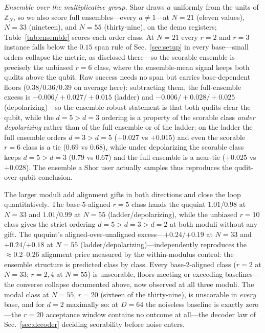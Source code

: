 \documentclass[aps,pra,reprint,superscriptaddress,nofootinbib,floatfix]{revtex4-2}
\begin{document}
\emph{Ensemble over the multiplicative group.} Shor draws $a$
uniformly from the units of $\mathbb{Z}_N$, so we also score full
ensembles---every $a\neq1$---at $N=21$ (eleven values), $N=33$
(nineteen), and $N=55$ (thirty-nine), on the demo registers;
Table~\ref{tab:ensemble} scores each order class. At $N=21$ every
$r=2$ and $r=3$ instance falls below the $0.15$ span rule of
Sec.~\ref{sec:setup} in every base---small orders collapse the
metric, as disclosed there---so the scorable ensemble is precisely
the unbiased $r=6$ class, where the ensemble-mean signal keeps both
qudits above the qubit. Raw success needs no span but carries
base-dependent floors ($0.38/0.36/0.39$ on average here):
subtracting them, the full-ensemble excess is
$-0.006/{+}0.027/{+}0.015$ (ladder) and $-0.006/{+}0.028/{+}0.025$
(depolarizing)---so the ensemble-robust statement is that both
qudits clear the qubit, while the $d{=}5>d{=}3$ ordering is a
property of the scorable class \emph{under depolarizing} rather
than of the full ensemble or of the ladder: on the ladder the full
ensemble orders $d{=}3>d{=}5$ ($+0.027$ vs $+0.015$) and even the
scorable $r=6$ class is a tie ($0.69$ vs $0.68$), while under
depolarizing the scorable class keeps $d{=}5>d{=}3$ ($0.79$ vs
$0.67$) and the full ensemble is a near-tie ($+0.025$ vs
$+0.028$).
The ensemble a Shor user actually samples thus reproduces the
qudit-over-qubit conclusion.

The larger moduli add alignment gifts in both directions and close
the loop quantitatively. The base-5-aligned $r=5$ class hands the
ququint $1.01$/$0.98$ at $N=33$ and $1.01$/$0.99$ at $N=55$
(ladder/depolarizing), while the unbiased $r=10$ class gives the
strict ordering $d{=}5>d{=}3>d{=}2$ at both moduli without any
gift. The ququint's aligned-over-unaligned excess---$+0.24$/$+0.19$
at $N=33$ and $+0.24$/$+0.18$ at $N=55$
(ladder/depolarizing)---independently reproduces the
${\approx}0.2$--$0.26$ alignment price measured by the
within-modulus control: the ensemble structure is predicted class by class. Every
base-2-aligned class ($r=2$ at $N=33$; $r=2,4$ at $N=55$) is
unscorable, floors meeting or exceeding baselines---the converse
collapse documented above, now observed at all three moduli. The
modal class at $N=55$, $r=20$ (sixteen of the thirty-nine), is
unscorable in \emph{every} base, and for $d=2$ maximally so: at
$D=64$ the noiseless baseline is exactly zero---the $r=20$
acceptance window contains no outcome at all---the decoder law of
Sec.~\ref{sec:decoder} deciding scorability before noise enters.
\end{document}
